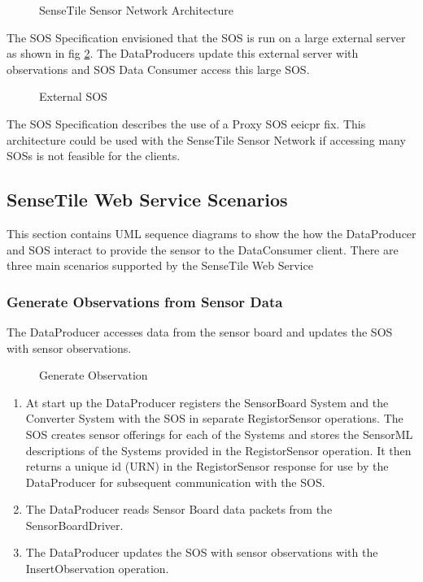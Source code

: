 \documentclass[]{final_report}
\begin{document}
\begin{figure}[h]
\caption{SenseTile Sensor Network Architecture}\label{fig:Deployment_network}
\end{figure}
The SOS Specification envisioned that the SOS is run on a large external server as shown in fig \ref{fig:Deployment_ext_sos}. The DataProducers update this external server with observations and SOS Data Consumer access this large SOS.
\begin{figure}[h]
\centering
{}
\caption{External SOS}\label{fig:Deployment_ext_sos}
\end{figure}

The SOS Specification describes the use of a Proxy SOS eeicpr fix. This architecture could be used with the SenseTile Sensor Network if accessing many SOSs is not feasible for the clients.

\newpage
\subsection{SenseTile Web Service Scenarios}
This section contains UML sequence diagrams to show the how the DataProducer and SOS interact to provide the sensor to the DataConsumer client. There are three main scenarios supported by the SenseTile Web Service 

\subsubsection{Generate Observations from Sensor Data}
The DataProducer accesses data from the sensor board and updates the SOS with sensor observations.
\begin{figure}[h]
\centering
{}
\caption{Generate Observation}\label{fig:InsertObs}
\end{figure}
 \begin{enumerate}
\item At start up the DataProducer registers the SensorBoard System and the Converter System with the SOS in separate RegistorSensor operations. The SOS creates sensor offerings for each of the Systems and stores the SensorML descriptions of the Systems provided in the RegistorSensor operation. It then returns a unique id (URN) in the RegistorSensor response for use by the DataProducer for subsequent communication with the SOS.
\item The DataProducer reads Sensor Board data packets from the SensorBoardDriver.
\item The DataProducer updates the SOS with sensor observations with the InsertObservation operation.
\end{enumerate}
\end{document}

